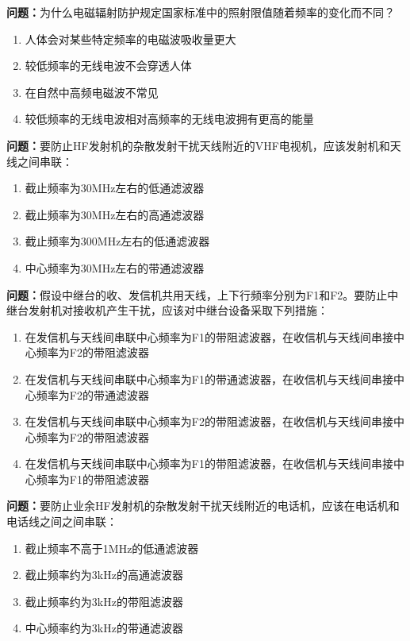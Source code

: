 \bigskip


\noindent\textbf{问题：}为什么电磁辐射防护规定国家标准中的照射限值随着频率的变化而不同？
\begin{enumerate}[label=\Alph*), leftmargin=3em]
	\item 人体会对某些特定频率的电磁波吸收量更大
	\item 较低频率的无线电波不会穿透人体
	\item 在自然中高频电磁波不常见
	\item 较低频率的无线电波相对高频率的无线电波拥有更高的能量
\end{enumerate}

\bigskip


\noindent\textbf{问题：}要防止HF发射机的杂散发射干扰天线附近的VHF电视机，应该发射机和天线之间串联：
\begin{enumerate}[label=\Alph*), leftmargin=3em]
	\item 截止频率为30MHz左右的低通滤波器
	\item 截止频率为30MHz左右的高通滤波器
	\item 截止频率为300MHz左右的低通滤波器
	\item 中心频率为30MHz左右的带通滤波器
\end{enumerate}

\bigskip


\noindent\textbf{问题：}假设中继台的收、发信机共用天线，上下行频率分别为F1和F2。要防止中继台发射机对接收机产生干扰，应该对中继台设备采取下列措施：
\begin{enumerate}[label=\Alph*), leftmargin=3em]
	\item 在发信机与天线间串联中心频率为F1的带阻滤波器，在收信机与天线间串接中心频率为F2的带阻滤波器
	\item 在发信机与天线间串联中心频率为F1的带通滤波器，在收信机与天线间串接中心频率为F2的带通滤波器
	\item 在发信机与天线间串联中心频率为F2的带阻滤波器，在收信机与天线间串接中心频率为F2的带阻滤波器
	\item 在发信机与天线间串联中心频率为F1的带阻滤波器，在收信机与天线间串接中心频率为F1的带阻滤波器
\end{enumerate}

\bigskip


\noindent\textbf{问题：}要防止业余HF发射机的杂散发射干扰天线附近的电话机，应该在电话机和电话线之间之间串联：
\begin{enumerate}[label=\Alph*), leftmargin=3em]
	\item 截止频率不高于1MHz的低通滤波器
	\item 截止频率约为3kHz的高通滤波器
	\item 截止频率约为3kHz的带阻滤波器
	\item 中心频率约为3kHz的带通滤波器
\end{enumerate}

